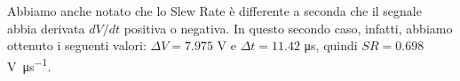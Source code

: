 Abbiamo anche notato che lo Slew Rate è differente a seconda che il segnale abbia derivata $dV/dt$ positiva o negativa. In questo secondo caso, infatti, abbiamo ottenuto i seguenti valori: $\Delta V = 7.975$ \si{\volt} e $\Delta t = 11.42$ \si{\micro\second}, quindi $SR = 0.698$ \si{\volt\per\micro\second}.